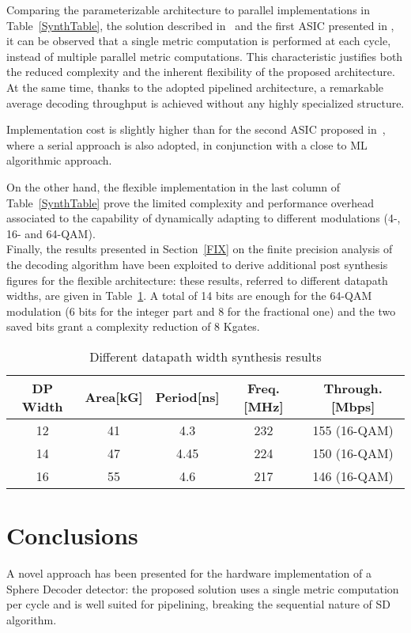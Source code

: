 \documentclass[12pt,onecolumn,draftclsnofoot]{IEEEtran}
\begin{document}
Comparing the parameterizable architecture to parallel implementations
in Table~\ref{SynthTable}, the solution described in~\cite{lundvlsi} and 
the first ASIC presented in \cite{ethvlsi},
it can be observed that a single metric computation is performed at
each cycle, instead of multiple parallel metric computations. This
characteristic justifies both the reduced complexity and the inherent
flexibility of the proposed architecture.
At the same time, thanks to the adopted pipelined architecture, a
remarkable average decoding throughput is achieved without any 
highly specialized structure.

Implementation cost is slightly higher than for the second ASIC 
proposed in~\cite{ethvlsi}, where a serial approach is also adopted, in conjunction with 
a close to ML algorithmic approach. 

On the other hand, the flexible implementation in the last column of Table~\ref{SynthTable} 
prove the limited complexity and performance overhead associated to the 
capability of dynamically adapting to different modulations (4-,
16- and 64-QAM).\\

Finally, the results presented in Section~\ref{FIX} on the finite precision
analysis of the decoding algorithm have been exploited to derive
additional post synthesis figures for the flexible architecture:
these results, referred to different datapath widths, are given in
Table~\ref{Table:DP Width Synth}. A total of 14 bits are enough for
the 64-QAM modulation (6 bits for the integer part and 8 for the
fractional one) and the two saved bits grant a complexity reduction
of 8 Kgates.


\begin{table}
\centering
\caption{Different datapath width synthesis results}
\begin{tabular}{|c||c|c|c|c|} \hline
DP Width&Area[kG]&Period[ns]&Freq.[MHz]&Through.[Mbps]\\ \hline\hline
12 & 41 & 4.3 & 232 & 155 (16-QAM)\\ \hline
14 & 47 & 4.45 & 224 & 150 (16-QAM)\\ \hline
16 & 55 & 4.6 & 217 & 146 (16-QAM)\\ \hline\end{tabular}
\label{Table:DP Width Synth}
\end{table}


\section{Conclusions}
A novel approach has been presented for the hardware implementation 
of a Sphere Decoder detector: the proposed solution uses a single metric computation per cycle and
is well suited for pipelining, breaking the sequential nature of SD
algorithm.
\end{document}
